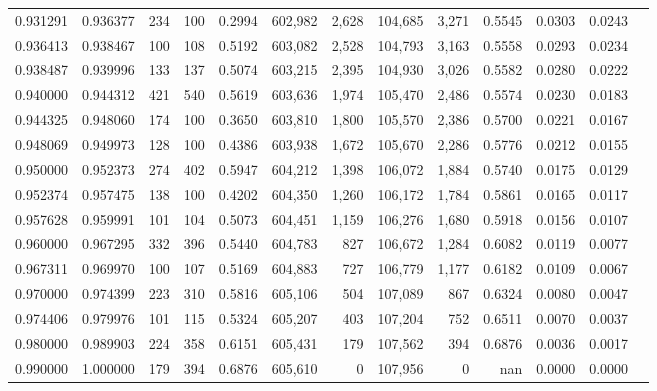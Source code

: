 \begin{tabular}{rrrrrrrrrrrrr}
0.931291 & 0.936377 &   234 & 100 &                                     0.2994 & 602,982 &   2,628 & 104,685 &   3,271 & 0.5545 & 0.0303 & 0.0243 \\
0.936413 & 0.938467 &   100 & 108 &                                     0.5192 & 603,082 &   2,528 & 104,793 &   3,163 & 0.5558 & 0.0293 & 0.0234 \\
0.938487 & 0.939996 &   133 & 137 &                                     0.5074 & 603,215 &   2,395 & 104,930 &   3,026 & 0.5582 & 0.0280 & 0.0222 \\
0.940000 & 0.944312 &   421 & 540 &                                     0.5619 & 603,636 &   1,974 & 105,470 &   2,486 & 0.5574 & 0.0230 & 0.0183 \\
0.944325 & 0.948060 &   174 & 100 &                                     0.3650 & 603,810 &   1,800 & 105,570 &   2,386 & 0.5700 & 0.0221 & 0.0167 \\
0.948069 & 0.949973 &   128 & 100 &                                     0.4386 & 603,938 &   1,672 & 105,670 &   2,286 & 0.5776 & 0.0212 & 0.0155 \\
0.950000 & 0.952373 &   274 & 402 &                                     0.5947 & 604,212 &   1,398 & 106,072 &   1,884 & 0.5740 & 0.0175 & 0.0129 \\
0.952374 & 0.957475 &   138 & 100 &                                     0.4202 & 604,350 &   1,260 & 106,172 &   1,784 & 0.5861 & 0.0165 & 0.0117 \\
0.957628 & 0.959991 &   101 & 104 &                                     0.5073 & 604,451 &   1,159 & 106,276 &   1,680 & 0.5918 & 0.0156 & 0.0107 \\
0.960000 & 0.967295 &   332 & 396 &                                     0.5440 & 604,783 &     827 & 106,672 &   1,284 & 0.6082 & 0.0119 & 0.0077 \\
0.967311 & 0.969970 &   100 & 107 &                                     0.5169 & 604,883 &     727 & 106,779 &   1,177 & 0.6182 & 0.0109 & 0.0067 \\
0.970000 & 0.974399 &   223 & 310 &                                     0.5816 & 605,106 &     504 & 107,089 &     867 & 0.6324 & 0.0080 & 0.0047 \\
0.974406 & 0.979976 &   101 & 115 &                                     0.5324 & 605,207 &     403 & 107,204 &     752 & 0.6511 & 0.0070 & 0.0037 \\
0.980000 & 0.989903 &   224 & 358 &                                     0.6151 & 605,431 &     179 & 107,562 &     394 & 0.6876 & 0.0036 & 0.0017 \\
0.990000 & 1.000000 &   179 & 394 &                                     0.6876 & 605,610 &       0 & 107,956 &       0 &    nan & 0.0000 & 0.0000 \\
\bottomrule
\end{tabular}
